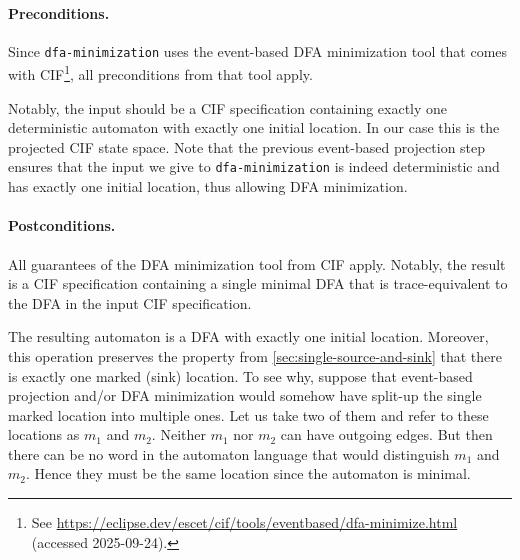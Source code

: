 \documentclass{article}
\newcommand{\keyw}[1]{\texttt{#1}}
\newcommand{\dfaMinimizationLabel}[0]{\keyw{dfa-minimization}}
\theoremstyle{definition}
\begin{document}
\paragraph{Preconditions.}
Since \dfaMinimizationLabel{} uses the event-based DFA minimization tool that comes with CIF\footnote{See \url{https://eclipse.dev/escet/cif/tools/eventbased/dfa-minimize.html} (accessed 2025-09-24).}, all preconditions from that tool apply.

Notably, the input should be a CIF specification containing exactly one deterministic automaton with exactly one initial location.
In our case this is the projected CIF state space.
Note that the previous event-based projection step ensures that the input we give to \dfaMinimizationLabel{} is indeed deterministic and has exactly one initial location, thus allowing DFA minimization.

\paragraph{Postconditions.}
All guarantees of the DFA minimization tool from CIF apply.
Notably, the result is a CIF specification containing a single minimal DFA that is trace-equivalent to the DFA in the input CIF specification.

The resulting automaton is a DFA with exactly one initial location.
Moreover, this operation preserves the property from \autoref{sec:single-source-and-sink} that there is exactly one marked (sink) location.
To see why, suppose that event-based projection and/or DFA minimization would somehow have split-up the single marked location into multiple ones.
Let us take two of them and refer to these locations as $m_1$ and $m_2$.
Neither $m_1$ nor $m_2$ can have outgoing edges.
But then there can be no word in the automaton language that would distinguish $m_1$ and $m_2$.
Hence they must be the same location since the automaton is minimal.
\end{document}
